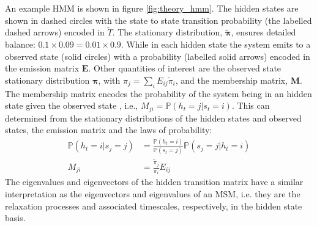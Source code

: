 An example HMM is shown in figure \ref{fig:theory_hmm}. The hidden states are shown in dashed circles with the state to state transition probability (the labelled dashed arrows) encoded in $\widetilde{T}$. The stationary distribution, $\widetilde{\bm{\pi}}$,  ensures detailed balance: $0.1\times 0.09 = 0.01\times 0.9$. While in each hidden state the system emits to a observed state (solid circles) with a probability (labelled solid arrows) encoded in the emission matrix $\mathbf{E}$. Other quantities of interest are the observed state stationary distribution $\bm{\pi}$, with $\pi_{j} = \sum_{i}E_{ij}\widetilde{\pi}_{i}$, and the membership matrix, $\mathbf{M}$. The membership matrix encodes the probability of the system being in an hidden state given the observed state \cite{noeProjectedHiddenMarkov2013a}, i.e., $M_{ji}=\mathbb{P}(h_t=j|s_t=i)$. This can determined from the stationary distributions of the hidden states and observed states, the emission matrix and the laws of probability: 
\begin{align}
    \mathbb{P}(h_t=i|s_j=j) &= \frac{\mathbb{P}(h_t=i)}{\mathbb{P}(s_t=j)}\mathbb{P}(s_j=j|h_t=i) \\
    M_{ji} &= \frac{\widetilde{\pi}_j}{\pi_i}E_{ij}
\end{align}
The eigenvalues and eigenvectors of the hidden transition matrix have a similar interpretation as the eigenvectors and eigenvalues of an MSM, i.e. they are the relaxation processes and associated timescales, respectively, in the hidden state basis. 

